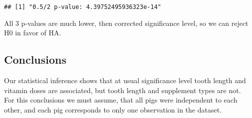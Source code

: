 \documentclass[]{article}
\begin{document}
\begin{verbatim}
## [1] "0.5/2 p-value: 4.39752495936323e-14"
\end{verbatim}

All 3 p-values are much lower, then corrected significance level, so we
can reject H0 in favor of HA.

\subsection{Conclusions}\label{conclusions}

Our statistical inference shows that at usual significance level tooth
length and vitamin doses are associated, but tooth length and supplement
types are not.\\
For this conclusions we must assume, that all pigs were independent to
each other, and each pig corresponds to only one observation in the
dataset.
\end{document}

